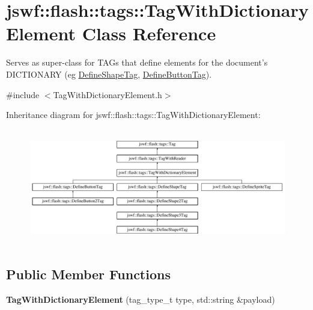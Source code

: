 \hypertarget{classjswf_1_1flash_1_1tags_1_1_tag_with_dictionary_element}{\section{jswf\+:\+:flash\+:\+:tags\+:\+:Tag\+With\+Dictionary\+Element Class Reference}
\label{classjswf_1_1flash_1_1tags_1_1_tag_with_dictionary_element}
}


Serves as super-\/class for {\ttfamily T\+A\+G}s that define elements for the document's {\ttfamily D\+I\+C\+T\+I\+O\+N\+A\+R\+Y} (eg \hyperlink{classjswf_1_1flash_1_1tags_1_1_define_shape_tag}{Define\+Shape\+Tag}, \hyperlink{classjswf_1_1flash_1_1tags_1_1_define_button_tag}{Define\+Button\+Tag}).  




{\ttfamily \#include $<$Tag\+With\+Dictionary\+Element.\+h$>$}

Inheritance diagram for jswf\+:\+:flash\+:\+:tags\+:\+:Tag\+With\+Dictionary\+Element\+:\begin{figure}[H]
\begin{center}
\leavevmode
\includegraphics[height=5.084306cm]{classjswf_1_1flash_1_1tags_1_1_tag_with_dictionary_element}
\end{center}
\end{figure}
\subsection*{Public Member Functions}
\begin{DoxyCompactItemize}
\item 
\hypertarget{classjswf_1_1flash_1_1tags_1_1_tag_with_dictionary_element_a162b32798b1175f370c810a7ed8ebe0a}{{\bfseries Tag\+With\+Dictionary\+Element} (tag\+\_\+type\+\_\+t type, std\+::string \&payload)}\label{classjswf_1_1flash_1_1tags_1_1_tag_with_dictionary_element_a162b32798b1175f370c810a7ed8ebe0a}

\end{DoxyCompactItemize}
